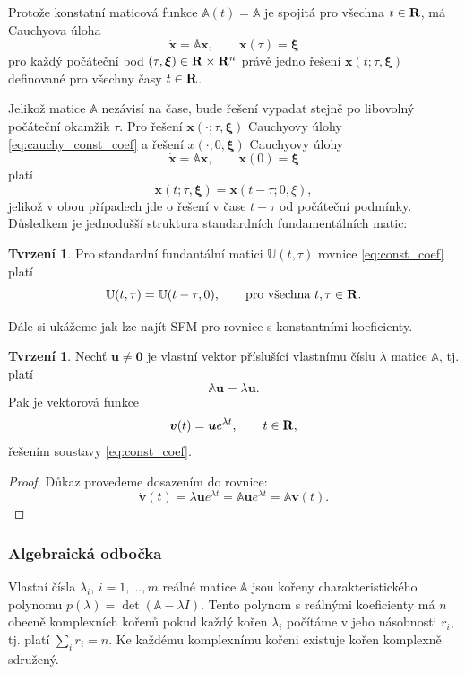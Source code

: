 \documentclass[a4paper, 12pt]{book}
\theoremstyle{definition}
\newtheorem{proposition}[theorem]{Tvrzení}
\def\Real{{\rm\bf R}}
\def\vc#1{\mathbf{\boldsymbol{#1}}}     %
\def\tn#1{{\mathbb{#1}}}    %
\begin{document}
Protože konstatní maticová funkce $\tn A(t)=\tn A$ je spojitá pro všechna $t\in \Real$, má Cauchyova úloha
\begin{equation}
    \label{eq:cauchy_const_coef}
    \dot{\vc x} = {\tn A}\vc x,\qquad \vc x(\tau)=\vc\xi
\end{equation}
pro každý počáteční bod $(\tau,\vc\xi)\in \Real\times \Real^n$ právě jedno řešení 
$\vc x(t;\tau,\vc\xi)$ definované pro všechny časy $t\in \Real$. 

Jelikož matice $\tn A$ nezávisí na čase, bude řešení vypadat stejně po libovolný počáteční okamžik $\tau$. Pro řešení $\vc x(\cdot;\tau, \vc \xi)$ 
Cauchyovy úlohy \eqref{eq:cauchy_const_coef} a řešení $x(\cdot; 0, \vc \xi)$ Cauchyovy úlohy
    \begin{equation}
        \dot{\vc x} = {\tn A}\vc x,\qquad \vc x(0)=\vc\xi
    \end{equation}
platí
\[
   \vc x(t;\tau, \vc \xi) = \vc x(t - \tau; 0, \xi),
\]
jelikož v obou případech jde o řešení v čase $t - \tau$ od počáteční podmínky. Důsledkem je jednodušší struktura standardních fundamentálních matic:
\begin{proposition}

Pro standardní fundantální matici $\tn U(t,\tau)$ rovnice \eqref{eq:const_coef}
platí
\[
    {\tn U}(t,\tau)={\tn U}(t-\tau,0),\qquad \text{pro všechna }t,\tau\in \Real.
\]
\end{proposition}

Dále si ukážeme jak lze najít SFM pro rovnice s konstantními koeficienty. 
\begin{proposition}
\label{prop:jedno_reseni}
Nechť $\vc u\ne \vc 0$ je vlastní vektor příslušící vlastnímu číslu $\lambda$ matice $\tn A$, tj. platí
\[
  \tn A \vc u = \lambda \vc u.
\]
Pak je vektorová funkce
\begin{equation}
\vc v(t)=\vc u e^{\lambda t},\qquad      t\in \Real,
\end{equation}
řešením soustavy \eqref{eq:const_coef}.
\end{proposition}
\begin{proof}
Důkaz provedeme dosazením do rovnice:
\[
  \dot{\vc v}(t) = \lambda \vc u e^{\lambda t} = \tn A \vc u e^{\lambda t} = \tn A \vc v(t).
\]
\end{proof}

\subsubsection{Algebraická odbočka}
Vlastní čísla $\lambda_i$, $i=1,\dots, m$ reálné matice $\tn A$ jsou kořeny charakteristického polynomu $p(\lambda) = \det(\tn A-\lambda I)$. 
Tento polynom s reálnými koeficienty má $n$ obecně komplexních kořenů pokud každý kořen $\lambda_i$ počítáme v jeho násobnosti $r_i$, tj. platí $\sum_i r_i = n$. 
Ke každému komplexnímu kořeni existuje kořen komplexně sdružený. 
\end{document}
